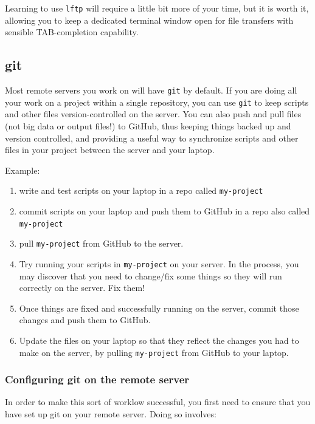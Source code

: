 \documentclass[]{krantz}
\providecommand{\tightlist}{%
  \setlength{\itemsep}{0pt}\setlength{\parskip}{0pt}}
\begin{document}
Learning to use \texttt{lftp} will require a little bit more of your time, but it is worth
it, allowing you to keep a dedicated terminal window open for file transfers with sensible
TAB-completion capability.

\hypertarget{git}{%
\subsection{git}\label{git}}

Most remote servers you work on will have \texttt{git} by default.
If you are doing all your work on a project within a single
repository, you can use \texttt{git} to keep scripts and other files
version-controlled on the server. You can also push and pull files
(not big data or output files!) to GitHub, thus keeping things backed up
and version controlled, and providing a useful way to synchronize scripts
and other files in your project between the server and your laptop.

Example:

\begin{enumerate}
\def\labelenumi{\arabic{enumi}.}
\tightlist
\item
  write and test scripts on your laptop in a repo called \texttt{my-project}
\item
  commit scripts on your laptop and push them to GitHub in a repo also
  called \texttt{my-project}
\item
  pull \texttt{my-project} from GitHub to the server.
\item
  Try running your scripts in \texttt{my-project} on your server. In the process,
  you may discover that you need to change/fix some things so they will
  run correctly on the server. Fix them!
\item
  Once things are fixed and successfully running on the server, commit
  those changes and push them to GitHub.
\item
  Update the files on your laptop so that they reflect the changes you
  had to make on the server, by pulling \texttt{my-project} from GitHub to your
  laptop.
\end{enumerate}

\hypertarget{configuring-git-on-the-remote-server}{%
\subsubsection{Configuring git on the remote server}\label{configuring-git-on-the-remote-server}}

In order to make this sort of worklow successful, you first need
to ensure that you have set up git on your remote server. Doing
so involves:
\end{document}
